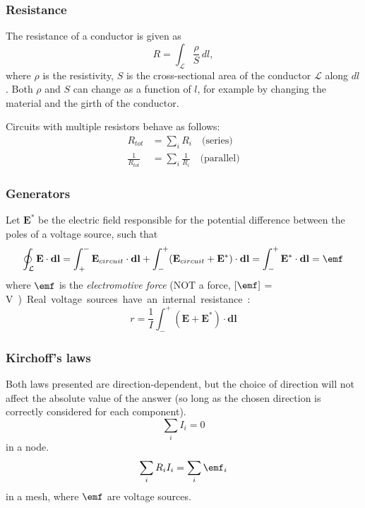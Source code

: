 \documentclass[a4paper, 12pt]{article}
\renewcommand{\vec}[1]{\mathbf{#1}}
\newcommand{\E}{\ensuremath{\vec{E}}}
\begin{document}
    \subsubsection{Resistance}
        The resistance of a conductor is given as
        \begin{equation}
            R = \int_\mathcal{L} \frac{\rho}{S}\, dl,
        \end{equation}
        where $\rho$ is the resistivity, 
        $S$ is the cross-sectional area of the conductor $\mathcal{L}$ along $dl$. 
        Both $\rho$ and $S$ can change as a function of $l$, for example by changing the material and the girth of the conductor.
        
        Circuits with multiple resistors behave as follows: 
        \begin{align}
            R_{tot} &= \sum_i R_i\quad \text{(series)} \\
            \frac{1}{R_{tot}} &= \sum_i \frac{1}{R_i} \quad\text{(parallel)}
        \end{align}
        
    \subsubsection{Generators}
        Let $\E^*$ be the electric field responsible for the potential difference between the poles of a voltage source, such that
        \begin{equation}
            \oint_\mathcal{L} \E\cdot \vec{dl} = \int_+^-\E_{circuit}\cdot \vec{dl} + \int_-^+(\E_{circuit} + \E^*)\cdot \vec{dl} = \int_-^+\E^*\cdot \vec{dl} = \emf
        \end{equation}
        where $\emf$ is the \textit{electromotive force} (NOT a force, $\left[\emf\right]$ = \si\volt)
        
        Real voltage sources have an internal resistance:
        \begin{equation}
            r = \frac{1}{I}\int_-^+(\E + \E^*)\cdot\vec{dl}
        \end{equation}
        
    \subsubsection{Kirchoff's laws}
        Both laws presented are direction-dependent, 
        but the choice of direction will not affect the absolute value of the answer 
        (so long as the chosen direction is correctly considered for each component). 
        \begin{equation}
            \sum_i I_i = 0
        \end{equation}
        in a node.
        \begin{equation}
            \sum_i R_iI_i = \sum_i \emf_i
        \end{equation}
        in a mesh, where $\emf$ are voltage sources. 
\end{document}
